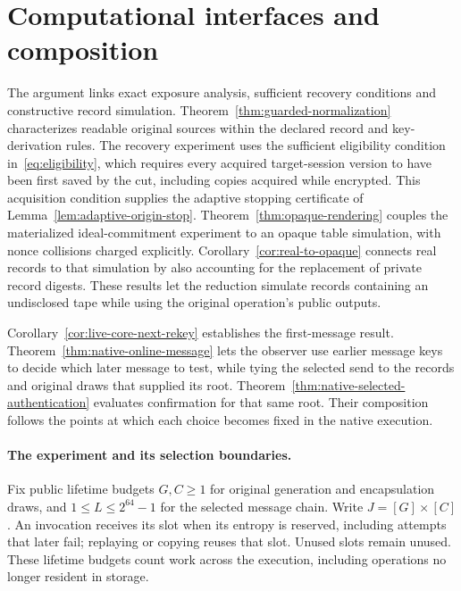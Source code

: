 \section{Computational interfaces and composition}
\label{sec:computation}

The argument links exact exposure analysis, sufficient recovery conditions
and constructive record simulation. Theorem~\ref{thm:guarded-normalization}
characterizes readable original sources within the declared record and
key-derivation rules. The recovery experiment uses the sufficient eligibility
condition in~\eqref{eq:eligibility}, which requires every acquired
target-session version to have been first saved by the cut, including copies
acquired while encrypted. This acquisition condition supplies the adaptive
stopping certificate of Lemma~\ref{lem:adaptive-origin-stop}.
Theorem~\ref{thm:opaque-rendering} couples the materialized
ideal-commitment experiment to an opaque table simulation, with nonce
collisions charged explicitly. Corollary~\ref{cor:real-to-opaque} connects
real records to that simulation by also accounting for the replacement of
private record digests. These results let the reduction simulate records
containing an undisclosed tape while using the original operation's public
outputs.

Corollary~\ref{cor:live-core-next-rekey} establishes the first-message
result. Theorem~\ref{thm:native-online-message} lets the observer use earlier
message keys to decide which later message to test, while tying the selected
send to the records and original draws that supplied its root.
Theorem~\ref{thm:native-selected-authentication} evaluates confirmation for
that same root. Their composition follows the points at which each choice
becomes fixed in the native execution.

\paragraph{The experiment and its selection boundaries.}
Fix public lifetime budgets $G,C\geq1$ for original generation and
encapsulation draws, and $1\le L\le2^{64}-1$ for the selected message chain.
Write $J=[G]\times[C]$. An invocation receives its slot when its entropy is
reserved, including attempts that later fail; replaying or copying reuses
that slot. Unused slots remain unused. These lifetime budgets count work
across the execution, including operations no longer resident in storage.


